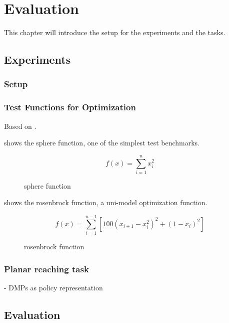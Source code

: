 
\chapter{Evaluation}
This chapter will introduce the setup for the experiments and the tasks.


\section{Experiments}

\subsection{Setup}

\subsection{Test Functions for Optimization}
Based on \citet{molga2005test}.

 shows the sphere function, one of the simplest test benchmarks.

$$ f(x) = \sum^n_{i=1}x_i^2 $$

\begin{figure}[ht!]
    \centering
    
    \caption{sphere function}
    \label{fig:sphere}
\end{figure}

 shows the rosenbrock function, a uni-model optimization function.

$$ f(x) = \sum^{n-1}_{i=1} [100(x_{i+1} - x_i^2)^2 + (1-x_i)^2] $$

\begin{figure}[ht!]
    \centering
    
    \caption{rosenbrock function}
    \label{fig:rosenbrock}
\end{figure}


\subsection{Planar reaching task}
- DMPs as policy representation


\section{Evaluation}
